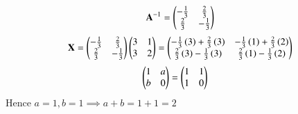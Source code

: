 \documentclass[journal]{IEEEtran}
\begin{document}
  \begin{align}
      \mathbf{A}^{-1}=\begin{pmatrix}-\frac{1}{3} & \frac{2}{3} \\\frac{2}{3} & -\frac{1}{3}\end{pmatrix}
  \end{align}
  \begin{align}
      \mathbf{X}=\begin{pmatrix}-\frac{1}{3} & \frac{2}{3} \\\frac{2}{3} & -\frac{1}{3}\end{pmatrix}\begin{pmatrix}3&1\\3&2\end{pmatrix} =\begin{pmatrix}-\frac{1}{3}\left(3\right)+\frac{2}{3}\left(3\right)&-\frac{1}{3}\left(1\right)+\frac{2}{3}\left(2\right) \\
      \frac{2}{3}\left(3\right)-\frac{1}{3}\left(3\right)&\frac{2}{3}\left(1\right)-\frac{1}{3}\left(2\right)  \end{pmatrix} 
      \end{align}
      \begin{align}
      \begin{pmatrix}1&a\\b&0\end{pmatrix}&=\begin{pmatrix}1& 1 \\1&0\end{pmatrix} 
  \end{align}
  Hence $a=1,b=1\implies a+b=1+1=2$
 
\end{document}
